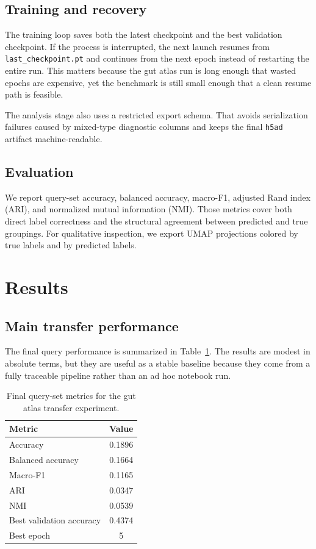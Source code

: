 \documentclass[11pt]{article}
\begin{document}
\subsection{Training and recovery}
The training loop saves both the latest checkpoint and the best validation checkpoint.
If the process is interrupted, the next launch resumes from \texttt{last\_checkpoint.pt} and continues from the next epoch instead of restarting the entire run.
This matters because the gut atlas run is long enough that wasted epochs are expensive, yet the benchmark is still small enough that a clean resume path is feasible.

The analysis stage also uses a restricted export schema.
That avoids serialization failures caused by mixed-type diagnostic columns and keeps the final \texttt{h5ad} artifact machine-readable.

\subsection{Evaluation}
We report query-set accuracy, balanced accuracy, macro-F1, adjusted Rand index (ARI), and normalized mutual information (NMI).
Those metrics cover both direct label correctness and the structural agreement between predicted and true groupings.
For qualitative inspection, we export UMAP projections colored by true labels and by predicted labels.

\section{Results}
\subsection{Main transfer performance}
The final query performance is summarized in Table~\ref{tab:main-metrics}.
The results are modest in absolute terms, but they are useful as a stable baseline because they come from a fully traceable pipeline rather than an ad hoc notebook run.

\begin{table}[H]
\centering
\caption{Final query-set metrics for the gut atlas transfer experiment.}
\label{tab:main-metrics}
\begin{tabular}{lc}
\toprule
Metric & Value \\
\midrule
Accuracy & 0.1896 \\
Balanced accuracy & 0.1664 \\
Macro-F1 & 0.1165 \\
ARI & 0.0347 \\
NMI & 0.0539 \\
Best validation accuracy & 0.4374 \\
Best epoch & 5 \\
\bottomrule
\end{tabular}
\end{table}
\end{document}
